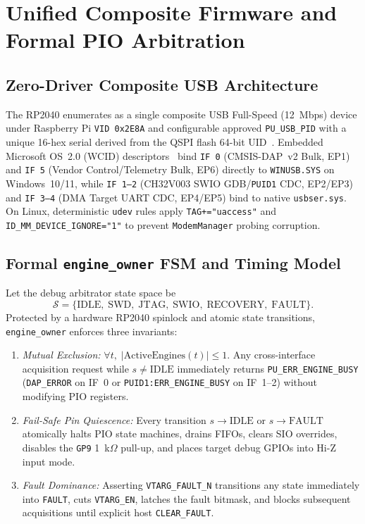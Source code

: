 \documentclass[journal]{IEEEtran}
\begin{document}
\section{Unified Composite Firmware and Formal PIO Arbitration}
\label{sec:firmware}
\subsection{Zero-Driver Composite USB Architecture}
The RP2040 enumerates as a single composite USB Full-Speed (12~Mbps) device under Raspberry Pi \texttt{VID 0x2E8A} and configurable approved \texttt{PU\_USB\_PID} with a unique 16-hex serial derived from the QSPI flash 64-bit UID~\cite{usb20_spec,tinyusb_docs}. Embedded Microsoft OS~2.0 (WCID) descriptors~\cite{ms_os_20_spec} bind \texttt{IF~0} (CMSIS-DAP~v2 Bulk, EP1)~\cite{arm_cmsis_dap} and \texttt{IF~5} (Vendor Control/Telemetry Bulk, EP6) directly to \texttt{WINUSB.SYS} on Windows~10/11, while \texttt{IF~1--2} (CH32V003 SWIO GDB/\texttt{PUID1} CDC, EP2/EP3) and \texttt{IF~3--4} (DMA Target UART CDC, EP4/EP5) bind to native \texttt{usbser.sys}. On Linux, deterministic \texttt{udev} rules apply \texttt{TAG+="uaccess"} and \texttt{ID\_MM\_DEVICE\_IGNORE="1"} to prevent \texttt{ModemManager} probing corruption.

\subsection{Formal \texttt{engine\_owner} FSM and Timing Model}
Let the debug arbitrator state space be
\begin{equation}
\mathcal{S} = \{\text{IDLE},\; \text{SWD},\; \text{JTAG},\; \text{SWIO},\; \text{RECOVERY},\; \text{FAULT}\}.
\end{equation}
Protected by a hardware RP2040 spinlock and atomic state transitions, \texttt{engine\_owner} enforces three invariants:
\begin{enumerate}
  \item \emph{Mutual Exclusion:} $\forall t,\; |\text{ActiveEngines}(t)| \le 1$. Any cross-interface acquisition request while $s \neq \text{IDLE}$ immediately returns \texttt{PU\_ERR\_ENGINE\_BUSY} (\texttt{DAP\_ERROR} on IF~0 or \texttt{PUID1:ERR\_ENGINE\_BUSY} on IF~1--2) without modifying PIO registers.
  \item \emph{Fail-Safe Pin Quiescence:} Every transition $s \to \text{IDLE}$ or $s \to \text{FAULT}$ atomically halts PIO state machines, drains FIFOs, clears SIO overrides, disables the \texttt{GP9} 1~k$\Omega$ pull-up, and places target debug GPIOs into Hi-Z input mode.
  \item \emph{Fault Dominance:} Asserting \texttt{VTARG\_FAULT\_N} transitions any state immediately into \texttt{FAULT}, cuts \texttt{VTARG\_EN}, latches the fault bitmask, and blocks subsequent acquisitions until explicit host \texttt{CLEAR\_FAULT}.
\end{enumerate}
\end{document}
